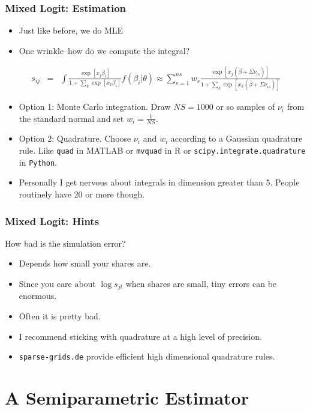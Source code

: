 \begin{frame}
\frametitle{Mixed Logit: Estimation}
 \begin{itemize}
\item Just like before, we do MLE
\item One wrinkle--how do we compute the integral?
 \end{itemize}
\begin{eqnarray*}
s_{ij} &=& \int \frac{\exp[x_{j} \beta_i  ]}{1+\sum_k \exp[x_{k} \beta_i  ]} f(\beta_i | \theta) \approx \sum_{s=1}^{ns} w_s \frac{\exp[x_{j} (\overline{\beta} + \Sigma \nu_{is})  ]}{1+\sum_k \exp[x_{k} (\overline{\beta} + \Sigma \nu_{is})  ]} 
\end{eqnarray*}
 \begin{itemize}
\item Option 1: Monte Carlo integration.  Draw $NS=1000$ or so samples of $\nu_i$ from the standard normal and set $w_i = \frac{1}{NS}$.
\item Option 2: Quadrature. Choose $\nu_i$ and $w_i$ according to a Gaussian quadrature rule. Like \texttt{quad} in MATLAB or \texttt{mvquad} in R or \texttt{scipy.integrate.quadrature} in \texttt{Python}.
\item Personally I get nervous about integrals in dimension greater than 5. People routinely have 20 or more though.
 \end{itemize}
\end{frame}

\begin{frame}
\frametitle{Mixed Logit: Hints}
 How bad is the simulation error?
 \begin{itemize}
\item Depends how small your shares are. 
\item Since you care about $\log s_{jt}$ when shares are small, tiny errors can be enormous.
\item Often it is pretty bad.
\item I recommend sticking with quadrature at a high level of precision.
\item \texttt{sparse-grids.de} provide efficient high dimensional quadrature rules.
 \end{itemize}
\end{frame}

\section{A Semiparametric Estimator}

